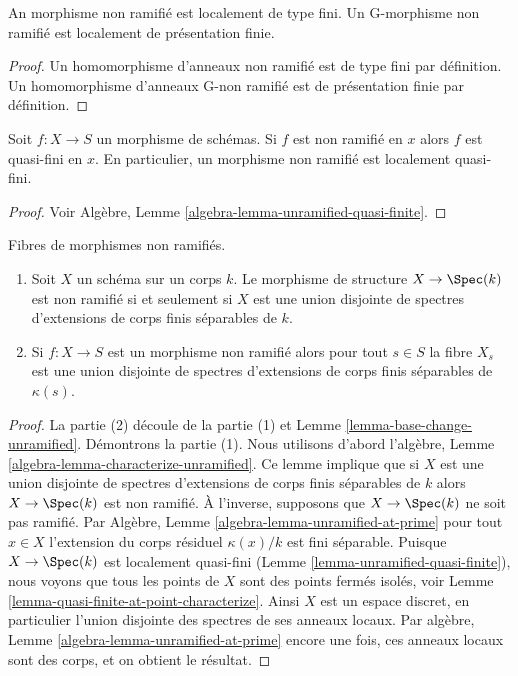\begin{lemma}
\label{lemma-unramified-locally-finite-type}
An morphisme non ramifié est localement de type fini. Un
G-morphisme non ramifié est localement de présentation finie.
\end{lemma}

\begin{proof}
Un homomorphisme d'anneaux non ramifié est de type fini par définition.
Un homomorphisme d'anneaux G-non ramifié est de présentation finie par définition.
\end{proof}

\begin{lemma}
\label{lemma-unramified-quasi-finite}
Soit $f : X \to S$ un morphisme de schémas. Si $f$
est non ramifié en $x$ alors $f$ est quasi-fini en $x$.
En particulier, un morphisme non ramifié est localement quasi-fini.
\end{lemma}

\begin{proof}
Voir Algèbre, Lemme \ref{algebra-lemma-unramified-quasi-finite}.
\end{proof}

\begin{lemma}
\label{lemma-unramified-over-field}
Fibres de morphismes non ramifiés.
\begin{enumerate}
\item Soit $X$ un schéma sur un corps $k$.
Le morphisme de structure $X \to \Spec(k)$ est non ramifié si et seulement
si $X$ est une union disjointe de spectres d'extensions de corps finis
séparables de $k$.
\item Si $f : X \to S$ est un morphisme non ramifié alors pour tout $s \in S$ la fibre
$X_s$ est une union disjointe de spectres d'extensions de corps finis
séparables de $\kappa(s)$.
\end{enumerate}
\end{lemma}

\begin{proof}
La partie (2) découle de la partie
(1) et Lemme \ref{lemma-base-change-unramified}. Démontrons
la partie (1). Nous utilisons
d'abord l'algèbre, Lemme \ref{algebra-lemma-characterize-unramified}. Ce lemme implique que
si $X$ est une union disjointe de spectres d'extensions de corps
finis séparables de $k$ alors $X \to \Spec(k)$ est non ramifié.
À l’inverse, supposons que $X \to \Spec(k)$ ne soit
pas ramifié. Par Algèbre, Lemme \ref{algebra-lemma-unramified-at-prime} pour tout $x \in X$ l'extension
du corps résiduel $\kappa(x)/k$ est fini
séparable. Puisque $X \to \Spec(k)$ est localement quasi-fini
(Lemme \ref{lemma-unramified-quasi-finite}), nous voyons que tous les
points de $X$ sont des points fermés isolés, voir
Lemme \ref{lemma-quasi-finite-at-point-characterize}. Ainsi $X$ est un espace
discret, en particulier l'union disjointe des spectres
de ses anneaux locaux. Par algèbre,
Lemme \ref{algebra-lemma-unramified-at-prime} encore une fois, ces anneaux locaux sont
des corps, et on obtient le résultat.
\end{proof}

